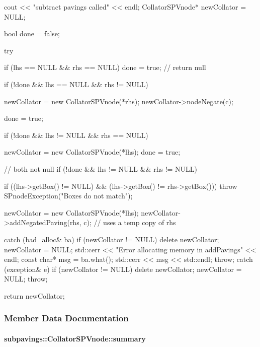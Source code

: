 \begin{DoxyCode}
    {
        cout << "subtract pavings called" << endl;
        CollatorSPVnode* newCollator = NULL;

        bool done = false;

        try {

            if (lhs == NULL && rhs == NULL) done = true; // return null

            if (!done && lhs == NULL && rhs != NULL) {

                newCollator = new CollatorSPVnode(*rhs);
                newCollator->nodeNegate(c);

                done = true;

            }
            if (!done && lhs != NULL && rhs == NULL) {

                newCollator = new CollatorSPVnode(*lhs);
                done = true;
            }
            // both not null
            if (!done && lhs != NULL && rhs != NULL) {

                if ((lhs->getBox() != NULL) &&
                                (lhs->getBox() != rhs->getBox())) {
                    throw SPnodeException("Boxes do not match");
                }

                newCollator = new CollatorSPVnode(*lhs);
                newCollator->addNegatedPaving(rhs, c);  // uses a temp copy of
       rhs
            }
        }
        catch (bad_alloc& ba) {
            if (newCollator != NULL) {
                delete newCollator;
                newCollator = NULL;
            }
            std::cerr << "Error allocating memory in addPavings" << endl;
            const char* msg = ba.what();
            std::cerr << msg << std::endl;
            throw;
        }
        catch (exception& e) {
            if (newCollator != NULL) {
                delete newCollator;
                newCollator = NULL;
            }
            throw;
        }

        return newCollator;
    }
\end{DoxyCode}


\subsubsection{\-Member \-Data \-Documentation}
\hypertarget{classsubpavings_1_1CollatorSPVnode_ad85d48d6c14888cc7d375f74b63c2f92}{
\paragraph[{summary}]{ {\bf subpavings\-::\-Collator\-S\-P\-Vnode\-::summary}}}\label{classsubpavings_1_1CollatorSPVnode_ad85d48d6c14888cc7d375f74b63c2f92}


